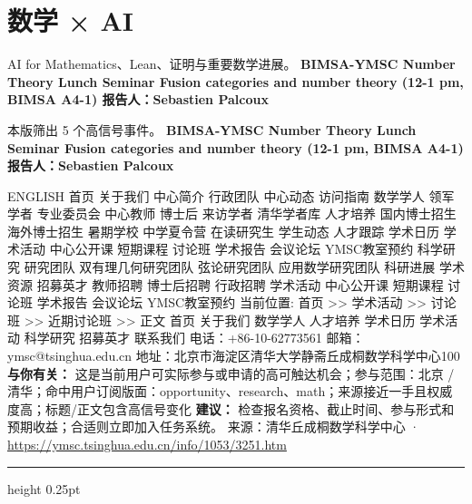 \documentclass[10.5pt]{ctexart}
\begin{document}
\section*{数学 × AI}
{\color{ormuted} AI for Mathematics、Lean、证明与重要数学进展。}
\vspace{2mm}
{\LARGE\bfseries BIMSA-YMSC Number Theory Lunch Seminar Fusion categories and number theory (12-1 pm, BIMSA A4-1) 报告人：Sebastien Palcoux}\par
\vspace{1mm}
{\color{ormuted} 本版筛出 5 个高信号事件。}
\vspace{3mm}
{\Large\bfseries BIMSA-YMSC Number Theory Lunch Seminar Fusion categories and number theory (12-1 pm, BIMSA A4-1) 报告人：Sebastien Palcoux}\par
ENGLISH 首页 关于我们 中心简介 行政团队 中心动态 访问指南 数学学人 领军学者 专业委员会 中心教师 博士后 来访学者 清华学者库 人才培养 国内博士招生 海外博士招生 暑期学校 中学夏令营 在读研究生 学生动态 人才跟踪 学术日历 学术活动 中心公开课 短期课程 讨论班 学术报告 会议论坛 YMSC教室预约 科学研究 研究团队 双有理几何研究团队 弦论研究团队 应用数学研究团队 科研进展 学术资源 招募英才 教师招聘 博士后招聘 行政招聘 学术活动 中心公开课 短期课程 讨论班 学术报告 会议论坛 YMSC教室预约 当前位置: 首页 >> 学术活动 >> 讨论班 >> 近期讨论班 >> 正文 首页 关于我们 数学学人 人才培养 学术日历 学术活动 科学研究 招募英才 联系我们 电话：+86-10-62773561 邮箱：ymsc@tsinghua.edu.cn 地址：北京市海淀区清华大学静斋丘成桐数学科学中心100
\textbf{与你有关：} 这是当前用户可实际参与或申请的高可触达机会；参与范围：北京 / 清华；命中用户订阅版面：opportunity、research、math；来源接近一手且权威度高；标题/正文包含高信号变化
\textbf{建议：} 检查报名资格、截止时间、参与形式和预期收益；合适则立即加入任务系统。
{\footnotesize\color{ormuted} 来源：清华丘成桐数学科学中心 · \url{https://ymsc.tsinghua.edu.cn/info/1053/3251.htm}}
\vspace{4mm}
\hrule height 0.25pt
\vspace{3mm}
\end{document}
